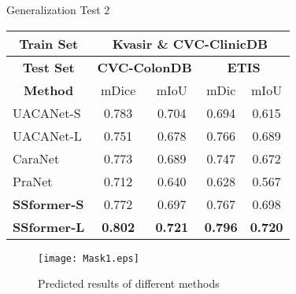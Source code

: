 \documentclass[runningheads]{llncs}
\begin{document}
\begin{minipage}{\textwidth}
\begin{minipage}[t]{0.49\textwidth}
\begin{tabular}{|l|cc|cc|}
\end{tabular}
        \end{minipage}
        \begin{minipage}[t]{0.531\textwidth}
        \centering
        \makeatletter{}\makeatother
        \caption{Generalization Test 2}
        \label{GT2}
            \begin{tabular}{|l|cc|cc|}
\hline
\multicolumn{1}{|c|}{\textbf{Train Set}} &
\multicolumn{4}{|c|}{\textbf{Kvasir \& CVC-ClinicDB}}        \\
\hline
\multicolumn{1}{|c|}{\textbf{Test Set}} & \multicolumn{2}{c|}{\textbf{CVC-ColonDB}}            & \multicolumn{2}{c|}{\textbf{ETIS}}                   \\ \hline
\multicolumn{1}{|c|}{\textbf{Method}}  & \multicolumn{1}{c|}{\quad mDice \quad}          & mIoU           & \multicolumn{1}{c|}{mDic}           & mIoU           \\ \hline
UACANet-S                              & \multicolumn{1}{c|}{0.783}          & 0.704          & \multicolumn{1}{c|}{0.694}          & 0.615          \\ \hline
UACANet-L                              & \multicolumn{1}{c|}{0.751}          & 0.678          & \multicolumn{1}{c|}{0.766}          & 0.689          \\ \hline
CaraNet                                & \multicolumn{1}{c|}{0.773}          & 0.689          & \multicolumn{1}{c|}{0.747}          & 0.672          \\ \hline
PraNet                                 & \multicolumn{1}{c|}{0.712}          & 0.640          & \multicolumn{1}{c|}{0.628}          & 0.567          \\ \hline
\textbf{SSformer-S}                    & \multicolumn{1}{c|}{0.772}          & 0.697          & \multicolumn{1}{c|}{0.767}          & 0.698          \\ \hline
\textbf{SSformer-L}                    & \multicolumn{1}{c|}{\textbf{0.802}} & \textbf{0.721} & \multicolumn{1}{c|}{\textbf{0.796}} & \textbf{0.720} \\ \hline
\end{tabular}
        \end{minipage}
    \end{minipage}

\begin{figure}[htbp]
    \centering
    \texttt{[image: Mask1.eps]}
    \caption{Predicted results of different methods}
    \label{Mask}
\end{figure}
\end{document}
